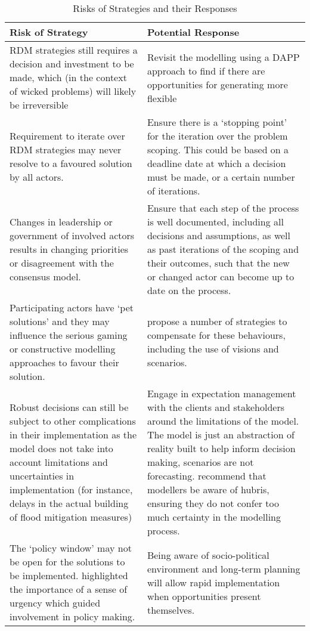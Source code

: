 \begin{table}[h!]
\caption{Risks of Strategies and their Responses}
\label{tab:pr-risks-and-responses}
\centering
\begin{tabular}{p{}|p{}}
\hline
Risk of Strategy &
  Potential Response \\ \hline
RDM strategies still requires a decision and investment to be made, which (in the context of wicked problems) will likely be irreversible &
  Revisit the modelling using a DAPP approach to find if there are opportunities for generating more flexible \\ \hline
Requirement to iterate over RDM strategies may never resolve to a favoured solution by all actors. &
  Ensure there is a ‘stopping point’ for the iteration over the problem scoping. This could be based on a deadline date at which a decision must be made, or a certain number of iterations. \\ \hline
Changes in leadership or government of involved actors results in changing priorities or disagreement with the consensus model. &
  Ensure that each step of the process is well documented, including all decisions and assumptions, as well as past iterations of the scoping and their outcomes, such that the new or changed actor can become up to date on the process. \\ \hline
Participating actors have ‘pet solutions’ and they may influence the serious gaming or constructive modelling approaches to favour their solution. &
  \citeauthor{pot_what_2018} propose a number of strategies to compensate for these behaviours, including the use of visions and scenarios. \\ \hline
Robust decisions can still be subject to other complications in their implementation as the model does not take into account limitations and uncertainties in implementation (for instance, delays in the actual building of flood mitigation measures) &
  Engage in expectation management with the clients and stakeholders around the limitations of the model. The model is just an abstraction of reality built to help inform decision making, scenarios are not forecasting. \cite{saltelli_five_2020} recommend that modellers be aware of hubris, ensuring they do not confer too much certainty in the modelling process. \\ \hline
The ‘policy window’ may not be open for the solutions to be implemented. \cite{rijke_room_2012} highlighted the importance of a sense of urgency which guided involvement in policy making. & Being aware of socio-political environment and long-term planning will allow rapid implementation when opportunities present themselves.

\end{tabular}
\end{table}
